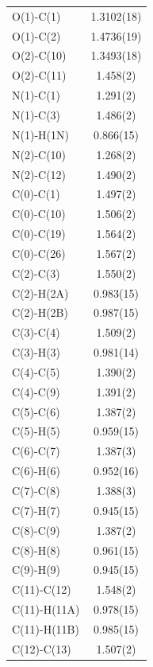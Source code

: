 \begin{center}
\tablefirsthead{%
\toprule}
\tablelasttail{\bottomrule}
{\footnotesize \singlespacing
\begin{supertabular}{p{1.5in}c}
O(1)-C(1) &1.3102(18)\\
O(1)-C(2) &1.4736(19)\\
O(2)-C(10) &1.3493(18)\\
O(2)-C(11) &1.458(2)\\
N(1)-C(1) &1.291(2)\\
N(1)-C(3) &1.486(2)\\
N(1)-H(1N) &0.866(15)\\
N(2)-C(10) &1.268(2)\\
N(2)-C(12) &1.490(2)\\
C(0)-C(1) &1.497(2)\\
C(0)-C(10) &1.506(2)\\
C(0)-C(19) &1.564(2)\\
C(0)-C(26) &1.567(2)\\
C(2)-C(3) &1.550(2)\\
C(2)-H(2A) &0.983(15)\\
C(2)-H(2B) &0.987(15)\\
C(3)-C(4) &1.509(2)\\
C(3)-H(3) &0.981(14)\\
C(4)-C(5) &1.390(2)\\
C(4)-C(9) &1.391(2)\\
C(5)-C(6) &1.387(2)\\
C(5)-H(5) &0.959(15)\\
C(6)-C(7) &1.387(3)\\
C(6)-H(6) &0.952(16)\\
C(7)-C(8) &1.388(3)\\
C(7)-H(7) &0.945(15)\\
C(8)-C(9) &1.387(2)\\
C(8)-H(8) &0.961(15)\\
C(9)-H(9) &0.945(15)\\
C(11)-C(12) &1.548(2)\\
C(11)-H(11A) &0.978(15)\\
C(11)-H(11B) &0.985(15)\\
C(12)-C(13) &1.507(2)\\

\end{supertabular}}
\end{center}
